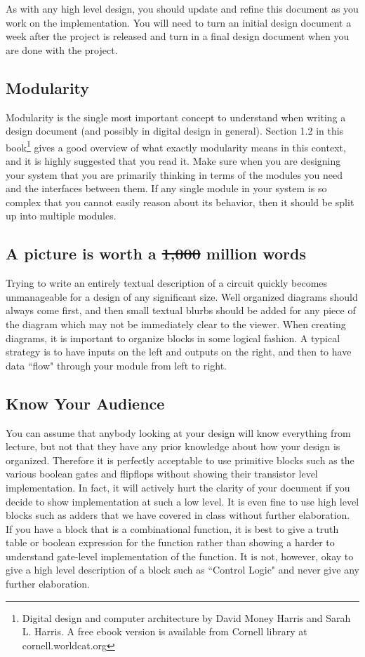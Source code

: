 \documentclass[10pt]{article}
\begin{document}
As with any high level design, you should update and refine this document
as you work on the implementation.  You will need to turn an initial design document a week after the project is released and turn in a final design document when you are done with the project. 

\subsection{Modularity}
Modularity is the single most important concept to understand when writing a design document
(and possibly in digital design in general). Section 1.2 in this book\footnote[1]{Digital design 
and computer architecture by David Money Harris and Sarah L. Harris. A free ebook version is available from 
Cornell library at cornell.worldcat.org} gives a good overview of what
exactly modularity means in this context, and it is highly suggested that you read it. Make sure
when you are designing your system that you are primarily thinking in terms of the modules you
need and the interfaces between them. If any single module in your system is so complex
that you cannot easily reason about its behavior, then it should be split up into multiple modules.

\subsection{A picture is worth a \sout{1,000} million words}
Trying to write an entirely textual description of a circuit quickly becomes unmanageable for a
design of any significant size. Well organized diagrams should always come first, and then small
textual blurbs should be added for any piece of the diagram which may not be immediately
clear to the viewer. When creating diagrams, it is important to organize blocks in some logical
fashion. A typical strategy is to have inputs on the left and outputs on the right, and then to have
data ``flow" through your module from left to right.

\subsection{Know Your Audience}
You can assume that anybody looking at your design will know everything from lecture, but
not that they have any prior knowledge about how your design is organized. Therefore it
is perfectly acceptable to use primitive blocks such as the various boolean gates and flipflops
without showing their transistor level implementation. In fact, it will actively hurt the
clarity of your document if you decide to show implementation at such a low level. It is even
fine to use high level blocks such as adders that we have covered in class without further
elaboration. If you have a block that is a combinational function, it is best to give a truth table
or boolean expression for the function rather than showing a harder to understand gate-level
implementation of the function.
It is not, however, okay to give a high level description of a block such as ``Control Logic" and
never give any further elaboration.
\end{document}
